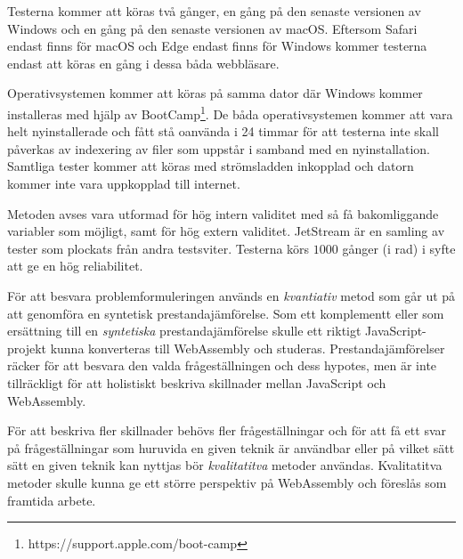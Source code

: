 \documentclass[swedish,template=rapport]{his}
\begin{document}
Testerna kommer att köras två gånger, en gång på den senaste versionen av Windows och en gång på den senaste versionen av macOS. Eftersom Safari endast finns för macOS och Edge endast finns för Windows kommer testerna endast att köras en gång i dessa båda webbläsare.

Operativsystemen kommer att köras på samma dator där Windows kommer installeras med hjälp av BootCamp\footnote{https://support.apple.com/boot-camp}. De båda operativsystemen kommer att vara helt nyinstallerade och fått stå oanvända i 24 timmar för att testerna inte skall påverkas av indexering av filer som uppstår i samband med en nyinstallation. Samtliga tester kommer att köras med strömsladden inkopplad och datorn kommer inte vara uppkopplad till internet. 

Metoden avses vara utformad för hög intern validitet med så få bakomliggande variabler som möjligt, samt för hög extern validitet. JetStream är en samling av tester som plockats från andra testsviter. Testerna körs $1 000$ gånger (i rad) i syfte att ge en hög reliabilitet.

För att besvara problemformuleringen används en \emph{kvantiativ} metod som går ut på att genomföra en syntetisk prestandajämförelse. Som ett komplementt eller som ersättning till en \emph{syntetiska} prestandajämförelse skulle ett riktigt JavaScript-projekt kunna konverteras till WebAssembly och studeras. Prestandajämförelser räcker för att besvara den valda frågeställningen och dess hypotes, men är inte tillräckligt för att holistiskt beskriva skillnader mellan JavaScript och WebAssembly.  

För att beskriva fler skillnader behövs fler frågeställningar och för att få ett svar på frågeställningar som huruvida en given teknik är användbar eller på vilket sätt sätt en given teknik kan nyttjas bör \emph{kvalitatitva} metoder användas. Kvalitatitva metoder skulle kunna ge ett större perspektiv på WebAssembly och föreslås som framtida arbete.

\clearpage

\printbibliography[heading=bibintoc]
\end{document}
